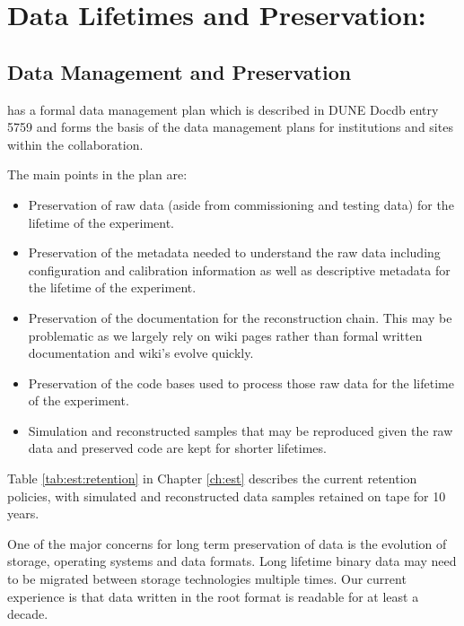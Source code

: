 \documentclass[../main-v1.tex]{subfiles}
\begin{document}
\chapter{Data Lifetimes and Preservation: }
\label{ch:pres}

\section{Data Management and Preservation}
 has a formal data management plan which is described in DUNE Docdb entry 5759 \cite{bib:docdb5759} and forms the basis of the data management plans for institutions and sites within the collaboration.

The main points in the plan are:

\begin{itemize} \item Preservation of raw data (aside from commissioning and testing data) for the lifetime of the experiment.
\item  Preservation of the metadata needed to understand the raw data including configuration and calibration information as well as descriptive metadata for the lifetime of the experiment.
\item Preservation of the documentation for the reconstruction chain.  This may be problematic as we largely rely on wiki pages rather than formal written documentation and wiki's evolve quickly. 
\item Preservation of the code bases used to process those raw data for the lifetime of the experiment.
\item Simulation and reconstructed samples that may be reproduced given the raw data and preserved code are kept for shorter lifetimes. 
\end{itemize}

Table \ref{tab:est:retention} in Chapter \ref{ch:est} describes the current retention policies, with simulated and reconstructed data samples retained on tape for 10 years. 

One of the major concerns for long term preservation of data is the evolution of storage,  operating systems and data formats. Long lifetime binary data may need to be migrated between storage technologies multiple times.   Our current experience is that data written in the root format is readable for at least a decade.   
\end{document}
